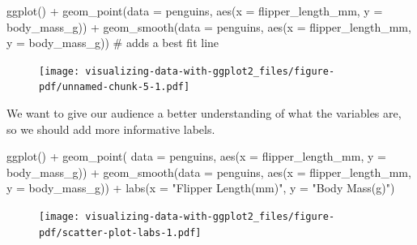 \documentclass[
  letterpaper,
  DIV=11,
  numbers=noendperiod,
  oneside]{scrreprt}
\newenvironment{Shaded}{\begin{snugshade}}{\end{snugshade}}
\newcommand{\AttributeTok}[1]{\textcolor[rgb]{0.40,0.45,0.13}{#1}}
\newcommand{\CommentTok}[1]{\textcolor[rgb]{0.37,0.37,0.37}{#1}}
\newcommand{\FunctionTok}[1]{\textcolor[rgb]{0.28,0.35,0.67}{#1}}
\newcommand{\NormalTok}[1]{\textcolor[rgb]{0.00,0.23,0.31}{#1}}
\newcommand{\SpecialCharTok}[1]{\textcolor[rgb]{0.37,0.37,0.37}{#1}}
\newcommand{\StringTok}[1]{\textcolor[rgb]{0.13,0.47,0.30}{#1}}
\begin{document}
\begin{Shaded}
\begin{Highlighting}[]
\FunctionTok{ggplot}\NormalTok{() }\SpecialCharTok{+}
  \FunctionTok{geom\_point}\NormalTok{(}\AttributeTok{data =}\NormalTok{ penguins,}
      \FunctionTok{aes}\NormalTok{(}\AttributeTok{x =}\NormalTok{ flipper\_length\_mm,}
         \AttributeTok{y =}\NormalTok{ body\_mass\_g)) }\SpecialCharTok{+}
  \FunctionTok{geom\_smooth}\NormalTok{(}\AttributeTok{data =}\NormalTok{ penguins,}
     \FunctionTok{aes}\NormalTok{(}\AttributeTok{x =}\NormalTok{ flipper\_length\_mm,}
         \AttributeTok{y =}\NormalTok{ body\_mass\_g)) }\CommentTok{\# adds a best fit line}
\end{Highlighting}
\end{Shaded}

\begin{figure}[H]

{\centering \texttt{[image: visualizing-data-with-ggplot2\_files/figure-pdf/unnamed-chunk-5-1.pdf]}

}

\end{figure}

We want to give our audience a better understanding of what the
variables are, so we should add more informative labels.

\begin{Shaded}
\begin{Highlighting}[]
\FunctionTok{ggplot}\NormalTok{() }\SpecialCharTok{+}
  \FunctionTok{geom\_point}\NormalTok{( }\AttributeTok{data =}\NormalTok{ penguins,}
            \FunctionTok{aes}\NormalTok{(}\AttributeTok{x =}\NormalTok{ flipper\_length\_mm, }\AttributeTok{y =}\NormalTok{ body\_mass\_g)) }\SpecialCharTok{+}
  \FunctionTok{geom\_smooth}\NormalTok{(}\AttributeTok{data =}\NormalTok{ penguins,}
           \FunctionTok{aes}\NormalTok{(}\AttributeTok{x =}\NormalTok{ flipper\_length\_mm, }\AttributeTok{y =}\NormalTok{ body\_mass\_g)) }\SpecialCharTok{+}
  \FunctionTok{labs}\NormalTok{(}\AttributeTok{x =} \StringTok{"Flipper Length(mm)"}\NormalTok{, }\AttributeTok{y =} \StringTok{"Body Mass(g)"}\NormalTok{)}
\end{Highlighting}
\end{Shaded}

\begin{figure}[H]

{\centering \texttt{[image: visualizing-data-with-ggplot2\_files/figure-pdf/scatter-plot-labs-1.pdf]}

}

\end{figure}
\end{document}
